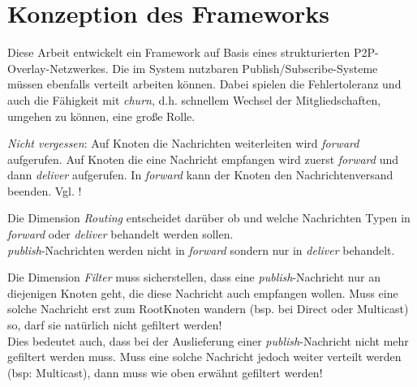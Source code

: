 \chapter{Konzeption des Frameworks}
\label{chap:konzeption_pubsub}
Diese Arbeit entwickelt ein Framework auf Basis eines strukturierten P2P-Overlay-Netzwerkes. Die im System nutzbaren Publish/Subscribe-Systeme müssen ebenfalls verteilt arbeiten können. Dabei spielen die Fehlertoleranz und auch die Fähigkeit mit \emph{churn}, d.h. schnellem Wechsel der Mitgliedschaften, umgehen zu können, eine große Rolle.

\emph{Nicht vergessen}: Auf Knoten die Nachrichten weiterleiten wird \emph{forward} aufgerufen. Auf Knoten die eine Nachricht empfangen wird zuerst \emph{forward} und dann \emph{deliver} aufgerufen. In \emph{forward} kann der Knoten den Nachrichtenversand beenden. Vgl. !

Die Dimension \emph{Routing} entscheidet darüber ob und welche Nachrichten Typen in \emph{forward} oder \emph{deliver} behandelt werden sollen.\\
\emph{publish}-Nachrichten werden nicht in \emph{forward} sondern nur in \emph{deliver} behandelt.

Die Dimension \emph{Filter} muss sicherstellen, dass eine \emph{publish}-Nachricht nur an diejenigen Knoten geht, die diese Nachricht auch empfangen wollen. Muss eine solche Nachricht erst zum RootKnoten wandern (bsp. bei Direct oder Multicast) so, darf sie natürlich nicht gefiltert werden!\\
Dies bedeutet auch, dass bei der Auslieferung einer \emph{publish}-Nachricht nicht mehr gefiltert werden muss. Muss eine solche Nachricht jedoch weiter verteilt werden (bsp: Multicast), dann muss wie oben erwähnt gefiltert werden!


\cite{Fischer2010a, Fischer2010Event}
\begin{table}[!h]
\label{tab:konzeption_pubsub:verbindungsmatrix}
\caption{Verbindungsmatrix}
\end{table}

